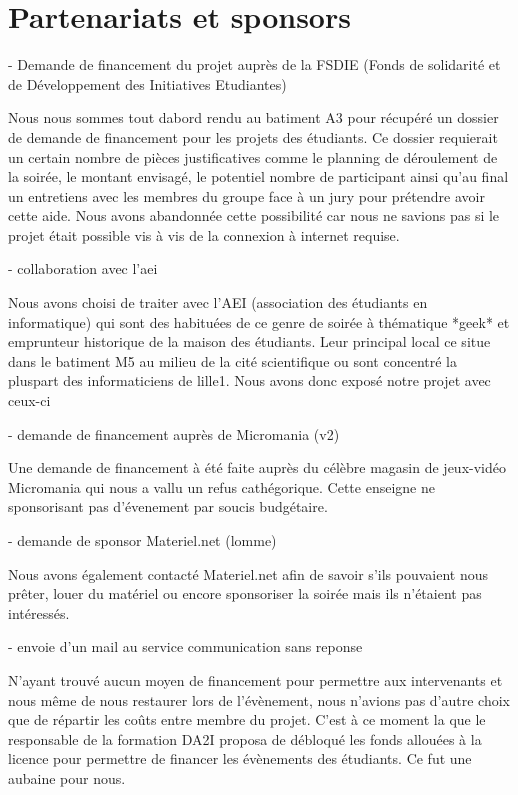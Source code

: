 \section{Partenariats et sponsors}%
\label{sec:partenariats_et_sponsors}

- Demande de financement du projet auprès de la FSDIE (Fonds de solidarité
et de Développement des Initiatives Etudiantes)

Nous nous sommes tout dabord rendu au batiment A3 pour récupéré un
dossier de demande de financement pour les projets des étudiants. Ce
dossier requierait un certain nombre de pièces justificatives comme le
planning de déroulement de la soirée, le montant envisagé, le potentiel
nombre de participant ainsi qu'au final un entretiens avec les membres
du groupe face à un jury pour prétendre avoir cette aide. Nous avons
abandonnée cette possibilité car nous ne savions pas si le projet était
possible vis à vis de la connexion à internet requise.

- collaboration avec l'aei

Nous avons choisi de traiter avec l'AEI (association des étudiants
en informatique) qui sont des habituées de ce genre de soirée à
thématique *geek* et emprunteur historique de la maison des étudiants.
Leur principal local ce situe dans le batiment M5 au milieu de la
cité scientifique ou sont concentré la pluspart des informaticiens de
lille1.
Nous avons donc exposé notre projet avec ceux-ci

- demande de financement auprès de Micromania (v2)

Une demande de financement à été faite auprès du célèbre magasin de
jeux-vidéo Micromania qui nous a vallu un refus cathégorique. Cette
enseigne ne sponsorisant pas d'évenement par soucis
budgétaire.

- demande de sponsor Materiel.net (lomme)

Nous avons également contacté Materiel.net afin de savoir s'ils pouvaient nous prêter,
louer du matériel ou encore sponsoriser la soirée mais ils n'étaient pas intéressés.

- envoie d'un mail au service communication sans reponse

N'ayant trouvé aucun moyen de financement pour permettre aux
intervenants et nous même de nous restaurer lors de l'évènement, nous
n'avions pas d'autre choix que de répartir les coûts entre membre du
projet. C'est à ce moment la que le responsable de la formation DA2I
proposa de débloqué les fonds allouées à la licence pour permettre de
financer les évènements des étudiants. Ce fut une aubaine pour nous.

